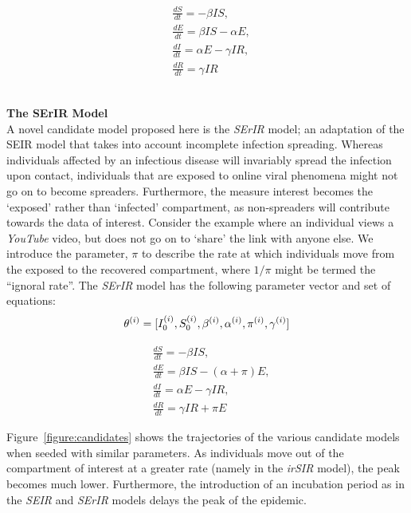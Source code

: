 \begin{framed}
\newpage
\begin{centering}
\begin{equation}
	\begin{split}
	&\frac{dS}{dt} = -\beta IS, \\
        &\frac{dE}{dt} = \beta IS - \alpha E, \\
	&\frac{dI}{dt} = \alpha E - \gamma IR, \\
	&\frac{dR}{dt} = \gamma IR
	\end{split}
\end{equation}
\end{centering}\\
{\bf The SErIR Model}\\
A novel candidate model proposed here is the \emph{SErIR} model; an
adaptation of the SEIR model that takes into account incomplete infection
spreading. Whereas individuals affected by an infectious disease will
invariably spread the infection upon contact, individuals that are
exposed to online viral phenomena might not go on to become
spreaders. Furthermore, the measure interest becomes the `exposed'
rather than `infected' compartment, as non-spreaders will contribute
towards the data of interest. Consider the example where an individual
views a \emph{YouTube} video, but does not go on to `share' the link
with anyone else. We introduce the parameter, $\pi$ to describe the
rate at which individuals move from the exposed to the recovered
compartment, where $1/\pi$ might be termed the ``ignoral rate''. The
\emph{SErIR} model has the following parameter vector and set of
equations:
\begin{equation}\centering\theta^{(i)} = [I_0^{(i)},
  S_0^{(i)}, \beta^{(i)}, \alpha^{(i)}, \pi^{(i)}, \gamma^{(i)}]\end{equation} 
\begin{centering}
\begin{equation}
	\begin{split}
	&\frac{dS}{dt} = -\beta IS, \\
        &\frac{dE}{dt} = \beta IS - (\alpha + \pi)E, \\
	&\frac{dI}{dt} = \alpha E - \gamma IR, \\
	&\frac{dR}{dt} = \gamma IR + \pi E
	\end{split}
\end{equation}
\end{centering}

\end{framed}

Figure~\ref{figure:candidates} shows the trajectories of the various
candidate models when seeded with similar parameters. As individuals
move out of the compartment of interest at a greater rate (namely in
the \emph{irSIR} model), the peak becomes much lower. Furthermore, the
introduction of an incubation period as in the \emph{SEIR} and
\emph{SErIR} models delays the peak of the epidemic.

